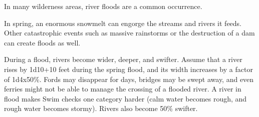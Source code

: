 In many wilderness areas, river floods are a common occurrence.

In spring, an enormous snowmelt can engorge the streams and rivers it feeds. Other 
catastrophic events such as massive rainstorms or the destruction of a dam can 
create floods as well.

During a flood, rivers become wider, deeper, and swifter. Assume that a river rises 
by 1d10+10 feet during the spring flood, and its width increases by a factor of 
1d4x50\%. Fords may disappear for days, bridges may be swept 
away, and even ferries might not be able to manage the crossing of a flooded river. 
A river in flood makes Swim checks one category harder (calm water becomes rough, 
and rough water becomes stormy). Rivers also become 50\% swifter.
